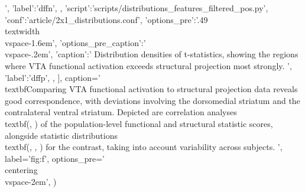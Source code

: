 \begin{sansmath}
{{                                ',
                        'label':'dffn',
                        },
                {'script':'scripts/distributions_features_filtered_pos.py', 'conf':'article/2x1_distributions.conf',
                        'options_pre':'{.49\\textwidth}\\vspace{-1.6em}',
                        'options_pre_caption':'\\vspace{-.2em}',
                        'caption':'
                                Distribution densities of t-statistics, showing the regions where VTA functional activation exceeds structural projection most strongly.
                                ',
                        'label':'dffp',
                        },
                ],
        caption='
                \\textbf{Comparing VTA functional activation to structural projection data reveals good correspondence, with deviations involving the dorsomedial striatum and the contralateral ventral striatum.}
                Depicted are correlation analyses \\textbf{(, )} of the population-level functional and structural statistic scores, alongside statistic distributions \\textbf{(, , )} for the contrast, taking into account variability across subjects.
                ',
        label='fig:f',
        options_pre='\\centering\n\\vspace{-2em}',
        )}
\end{sansmath}


